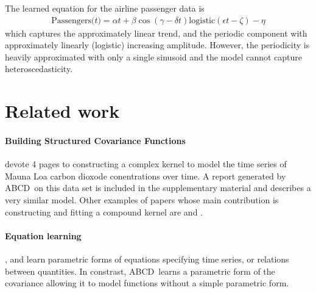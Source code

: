 \documentclass[letterpaper]{article}
\def\eg{e.g.\ }
\newcommand{\procedurename}{ABCD\ }
\begin{document}
The learned equation for the airline passenger data is
\begin{align*}
\textrm{Passengers($t$)} = \alpha t + \beta\cos(\gamma - \delta t)\textrm{logistic}(\epsilon t - \zeta) - \eta
\end{align*}
which captures the approximately linear trend, and the periodic component with approximately linearly (logistic) increasing amplitude.
However, the periodicity is heavily approximated with only a single sinusoid and the model cannot capture heteroscedasticity.

\section{Related work}

\paragraph{Building Structured Covariance Functions}

\cite{rasmussen38gaussian} devote 4 pages to constructing a complex kernel to model the time series of Mauna Loa carbon dioxode conentrations over time.
A report generated by \procedurename on this data set is included in the supplementary material and describes a very similar model. 
Other examples of papers whose main contribution is constructing and fitting a compound \gp{} kernel are \cite{klenske2012nonparametric} and \cite{lloydgefcom2012}.

\paragraph{Equation learning}

\cite{schmidt2009distilling}, \cite{todorovski1997declarative} and \cite{washio1999discovering} learn parametric forms of equations specifying time series, or relations between quantities.
In constrast, \procedurename learns a parametric form of the covariance allowing it to model functions without a simple parametric form.
\end{document}

